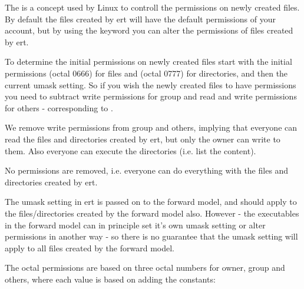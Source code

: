 \documentclass[a4paper,10pt,english]{sphinxmanual}
\begin{document}
\label{\detokenize{keywords/index:umask}}
\begin{sphinxShadowBox}

The  is a concept used by Linux to controll the permissions on
newly created files. By default the files created by ert will have the
default permissions of your account, but by using the keyword 
you can alter the permissions of files created by ert.

To determine the initial permissions on newly created files start with
the initial permissions  (octal 0666) for files and
 (octal 0777) for directories, and then  the
current umask setting. So if you wish the newly created files to have
permissions  you need to subtract write permissions for
group and read and write permissions for others - corresponding to
.

%
\begin{sphinxVerbatim}[commandchars=\\\{\}]
 
\end{sphinxVerbatim}

We remove write permissions from group and others, implying that
everyone can read the files and directories created by ert, but only the
owner can write to them. Also everyone can execute the directories (i.e.
list the content).

%
\begin{sphinxVerbatim}[commandchars=\\\{\}]
 
\end{sphinxVerbatim}

No permissions are removed, i.e. everyone can do everything with the
files and directories created by ert.

The umask setting in ert is passed on to the forward model, and should
apply to the files/directories created by the forward model also.
However - the executables in the forward model can in principle set it’s
own umask setting or alter permissions in another way - so there is no
guarantee that the umask setting will apply to all files created by the
forward model.

The octal permissions are based on three octal numbers for owner, group
and others, where each value is based on adding the constants:
\begin{quote}


\end{quote}
\end{sphinxShadowBox}
\end{document}
